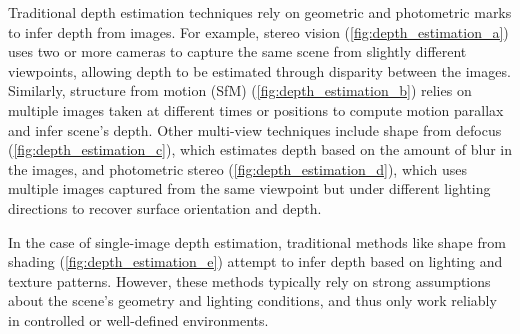 Traditional depth estimation techniques \cite{computer_vision_depth_estimation} rely on geometric and photometric marks to infer depth from images. For example, stereo vision (\ref{fig:depth_estimation_a}) uses two or more cameras to capture the same scene from slightly different viewpoints, allowing depth to be estimated through disparity between the images. Similarly, structure from motion (SfM) (\ref{fig:depth_estimation_b}) relies on multiple images taken at different times or positions to compute motion parallax and infer scene's depth. Other multi-view techniques include shape from defocus (\ref{fig:depth_estimation_c}), which estimates depth based on the amount of blur in the images, and photometric stereo (\ref{fig:depth_estimation_d}), which uses multiple images captured from the same viewpoint but under different lighting directions to recover surface orientation and depth.

In the case of single-image depth estimation, traditional methods like shape from shading (\ref{fig:depth_estimation_e}) attempt to infer depth based on lighting and texture patterns. However, these methods typically rely on strong assumptions about the scene's geometry and lighting conditions, and thus only work reliably in controlled or well-defined environments.

